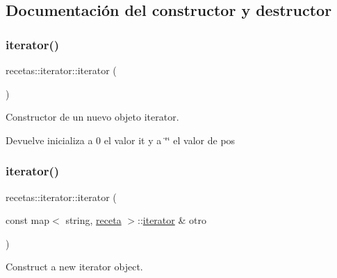 \subsection{Documentación del constructor y destructor}
\mbox{\label{classrecetas_1_1iterator_aedaa764b6ad6434a0345b2a3800ccddc}} 
\subsubsection{\texorpdfstring{iterator()}{iterator()}\hspace{0.1cm}{\footnotesize\ttfamily [1/3]}}
{\footnotesize\ttfamily recetas\+::iterator\+::iterator (\begin{DoxyParamCaption}{ }\end{DoxyParamCaption})\hspace{0.3cm}{\ttfamily [inline]}}



Constructor de un nuevo objeto iterator. 

\begin{DoxyReturn}{Devuelve}
inicializa a 0 el valor it y a \char`\"{}\char`\"{} el valor de pos 
\end{DoxyReturn}
\mbox{\label{classrecetas_1_1iterator_a88a67e3c3928c409f5e1ddf129a7f547}} 
\subsubsection{\texorpdfstring{iterator()}{iterator()}\hspace{0.1cm}{\footnotesize\ttfamily [2/3]}}
{\footnotesize\ttfamily recetas\+::iterator\+::iterator (\begin{DoxyParamCaption}\item[{const map$<$ string, \hyperlink{classreceta}{receta} $>$\+::\hyperlink{classrecetas_1_1iterator}{iterator} \&}]{otro }\end{DoxyParamCaption})\hspace{0.3cm}{\ttfamily [inline]}}



Construct a new iterator object. 


